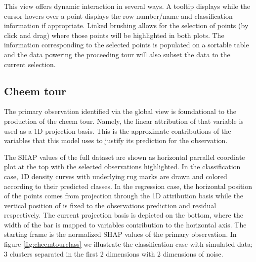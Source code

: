 \documentclass[
]{article}
\begin{document}
This view offers dynamic interaction in several ways. A tooltip displays while the cursor hovers over a point displays the row number/name and classification information if appropriate. Linked brushing allows for the selection of points (by click and drag) where those points will be highlighted in both plots. The information corresponding to the selected points is populated on a sortable table and the data powering the proceeding tour will also subset the data to the current selection.

\hypertarget{cheem-tour}{%
\subsection{Cheem tour}\label{cheem-tour}}

The primary observation identified via the global view is foundational to the production of the cheem tour. Namely, the linear attribution of that variable is used as a 1D projection basis. This is the approximate contributions of the variables that this model uses to justify its prediction for the observation.

The SHAP values of the full dataset are shown as horizontal parrallel coordiate plot at the top with the selected observations highlighted. In the classification case, 1D density curves with underlying rug marks are drawn and colored according to their predicted classes. In the regression case, the horizontal position of the points comes from projection through the 1D attribution basis while the vertical position of is fixed to the observations prediction and residual respectively. The current projection basis is depicted on the bottom, where the width of the bar is mapped to variables contribution to the horizontal axis. The starting frame is the normalized SHAP values of the primary observation. In figure \ref{fig:cheemtourclass} we illustrate the classification case with simulated data; 3 clusters separated in the first 2 dimensions with 2 dimensions of noise.
\end{document}
